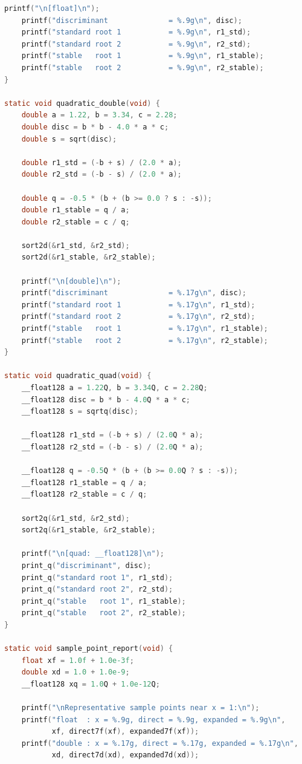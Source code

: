 \documentclass[12pt,a4paper]{article}
\begin{document}
\begin{lstlisting}[language=C]
    printf("\n[float]\n");
    printf("discriminant              = %.9g\n", disc);
    printf("standard root 1           = %.9g\n", r1_std);
    printf("standard root 2           = %.9g\n", r2_std);
    printf("stable   root 1           = %.9g\n", r1_stable);
    printf("stable   root 2           = %.9g\n", r2_stable);
}

static void quadratic_double(void) {
    double a = 1.22, b = 3.34, c = 2.28;
    double disc = b * b - 4.0 * a * c;
    double s = sqrt(disc);

    double r1_std = (-b + s) / (2.0 * a);
    double r2_std = (-b - s) / (2.0 * a);

    double q = -0.5 * (b + (b >= 0.0 ? s : -s));
    double r1_stable = q / a;
    double r2_stable = c / q;

    sort2d(&r1_std, &r2_std);
    sort2d(&r1_stable, &r2_stable);

    printf("\n[double]\n");
    printf("discriminant              = %.17g\n", disc);
    printf("standard root 1           = %.17g\n", r1_std);
    printf("standard root 2           = %.17g\n", r2_std);
    printf("stable   root 1           = %.17g\n", r1_stable);
    printf("stable   root 2           = %.17g\n", r2_stable);
}

static void quadratic_quad(void) {
    __float128 a = 1.22Q, b = 3.34Q, c = 2.28Q;
    __float128 disc = b * b - 4.0Q * a * c;
    __float128 s = sqrtq(disc);

    __float128 r1_std = (-b + s) / (2.0Q * a);
    __float128 r2_std = (-b - s) / (2.0Q * a);

    __float128 q = -0.5Q * (b + (b >= 0.0Q ? s : -s));
    __float128 r1_stable = q / a;
    __float128 r2_stable = c / q;

    sort2q(&r1_std, &r2_std);
    sort2q(&r1_stable, &r2_stable);

    printf("\n[quad: __float128]\n");
    print_q("discriminant", disc);
    print_q("standard root 1", r1_std);
    print_q("standard root 2", r2_std);
    print_q("stable   root 1", r1_stable);
    print_q("stable   root 2", r2_stable);
}

static void sample_point_report(void) {
    float xf = 1.0f + 1.0e-3f;
    double xd = 1.0 + 1.0e-9;
    __float128 xq = 1.0Q + 1.0e-12Q;

    printf("\nRepresentative sample points near x = 1:\n");
    printf("float  : x = %.9g, direct = %.9g, expanded = %.9g\n",
           xf, direct7f(xf), expanded7f(xf));
    printf("double : x = %.17g, direct = %.17g, expanded = %.17g\n",
           xd, direct7d(xd), expanded7d(xd));


\end{lstlisting}
\end{document}

